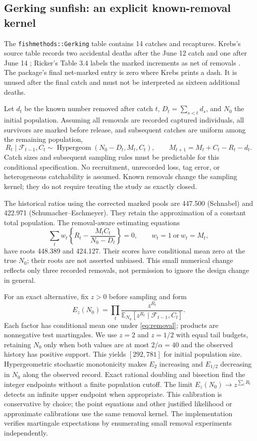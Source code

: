 \documentclass[11pt]{article}
\theoremstyle{remark}\newtheorem{remark}[theorem]{Remark}
\newcommand{\E}{\mathbb E}\newcommand{\PP}{\mathbb P}
\begin{document}
\subsection{Gerking sunfish: an explicit known-removal kernel}
The \texttt{fishmethods::Gerking} table contains 14 catches and recaptures.
Krebs's source table records two accidental deaths after the June 12 catch
and one after June 14 \cite{Krebs}; Ricker's Table 3.4 labels the marked
increments as net of removals \cite{Ricker1975}. The package's final net-marked
entry is zero where Krebs prints a dash. It is unused after the final catch
and must not be interpreted as sixteen additional deaths.

Let $d_t$ be the known number removed after catch $t$, $D_t=\sum_{s<t}d_s$,
and $N_0$ the initial population. Assuming all removals are recorded captured
individuals, all survivors are marked before release, and subsequent catches
are uniform among the remaining population,
\begin{equation}\label{eq:removal}
 R_t\mid\mathcal F_{t-1},C_t\sim
 \operatorname{Hypergeom}(N_0-D_t,M_t,C_t),\qquad
 M_{t+1}=M_t+C_t-R_t-d_t.
\end{equation}
Catch sizes and subsequent sampling rules must be predictable for this
conditional specification. No recruitment, unrecorded loss, tag error, or
heterogeneous catchability is assumed. Known removals change the sampling
kernel; they do not require treating the study as exactly closed.

The historical ratios using the corrected marked pools are 447.500
(Schnabel) and 422.971 (Schumacher--Eschmeyer). They retain the approximation
of a constant total population. The removal-aware estimating equations
\[
 \sum_t w_t\left\{R_t-\frac{M_tC_t}{N_0-D_t}\right\}=0,
 \qquad w_t=1\ \text{or}\ w_t=M_t,
\]
have roots 448.389 and 424.127. Their scores have conditional mean zero at
the true $N_0$; their roots are not asserted unbiased. This small numerical
change reflects only three recorded removals, not permission to ignore the
design change in general.

For an exact alternative, fix $z>0$ before sampling and form
\[
 E_z(N_0)=\prod_t\frac{z^{R_t}}
 {\E_{N_0}[z^{R_t}\mid\mathcal F_{t-1},C_t]}.
\]
Each factor has conditional mean one under \eqref{eq:removal}; products are
nonnegative test martingales. We use $z=2$ and $z=1/2$ with equal tail budgets,
retaining $N_0$ only when both values are at most $2/\alpha=40$ and the
observed history has positive support. This yields $[292,781]$ for initial
population size. Hypergeometric stochastic monotonicity makes $E_2$ increasing
and $E_{1/2}$ decreasing in $N_0$ along the observed record. Exact rational
doubling and bisection find the integer endpoints without a finite population
cutoff. The limit $E_z(N_0)\to z^{\sum_tR_t}$ detects an infinite upper endpoint
when appropriate. This calibration is conservative by choice; the point
equations and other justified likelihood or approximate calibrations use the
same removal kernel. The implementation verifies martingale expectations by
enumerating small removal experiments independently.
\end{document}

